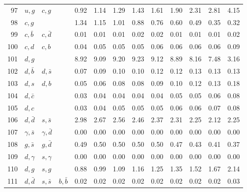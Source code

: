 \begin{tabularx}{\textwidth}{rXXX@{}S@{}S@{}S@{}S@{}S@{}S@{}S@{}S@{}S}
 97 & $u, g$           & $c, g$            &                  &  0.92 &  1.14 &  1.29 &  1.43 &  1.61 &  1.90 &  2.31 &  2.81 &  4.15 \\
 98 & $c, g$           &                   &                  &  1.34 &  1.15 &  1.01 &  0.88 &  0.76 &  0.60 &  0.49 &  0.35 &  0.32 \\
 99 & $c, \bar b$      & $c, \bar d$       &                  &  0.01 &  0.01 &  0.01 &  0.02 &  0.02 &  0.01 &  0.01 &  0.01 &  0.02 \\
100 & $c, d$           & $c, b$            &                  &  0.04 &  0.05 &  0.05 &  0.05 &  0.06 &  0.06 &  0.06 &  0.06 &  0.09 \\
101 & $d, g$           &                   &                  &  8.92 &  9.09 &  9.20 &  9.23 &  9.12 &  8.89 &  8.16 &  7.48 &  3.16 \\
102 & $d, \bar b$      & $d, \bar s$       &                  &  0.07 &  0.09 &  0.10 &  0.10 &  0.12 &  0.12 &  0.13 &  0.13 &  0.13 \\
103 & $d, s$           & $d, b$            &                  &  0.05 &  0.06 &  0.08 &  0.08 &  0.09 &  0.10 &  0.12 &  0.13 &  0.18 \\
104 & $d, \bar c$      &                   &                  &  0.03 &  0.04 &  0.04 &  0.04 &  0.04 &  0.05 &  0.05 &  0.06 &  0.08 \\
105 & $d, c$           &                   &                  &  0.03 &  0.04 &  0.05 &  0.05 &  0.05 &  0.06 &  0.06 &  0.07 &  0.08 \\
106 & $d, \bar d$      & $s, \bar s$       &                  &  2.98 &  2.67 &  2.56 &  2.46 &  2.37 &  2.31 &  2.25 &  2.12 &  2.25 \\
107 & $\gamma, \bar s$ & $\gamma, \bar d$  &                  &  0.00 &  0.00 &  0.00 &  0.00 &  0.00 &  0.00 &  0.00 &  0.00 &  0.00 \\
108 & $g, \bar s$      & $g, \bar d$       &                  &  0.49 &  0.50 &  0.50 &  0.50 &  0.50 &  0.47 &  0.43 &  0.41 &  0.37 \\
109 & $d, \gamma$      & $s, \gamma$       &                  &  0.00 &  0.00 &  0.00 &  0.00 &  0.00 &  0.00 &  0.00 &  0.00 &  0.00 \\
110 & $d, g$           & $s, g$            &                  &  0.88 &  0.99 &  1.09 &  1.16 &  1.25 &  1.35 &  1.52 &  1.67 &  2.14 \\
111 & $d, \bar d$      & $s, \bar s$       & $b, \bar b$      &  0.02 &  0.02 &  0.02 &  0.02 &  0.02 &  0.02 &  0.02 &  0.02 &  0.03 \\

\end{tabularx}
